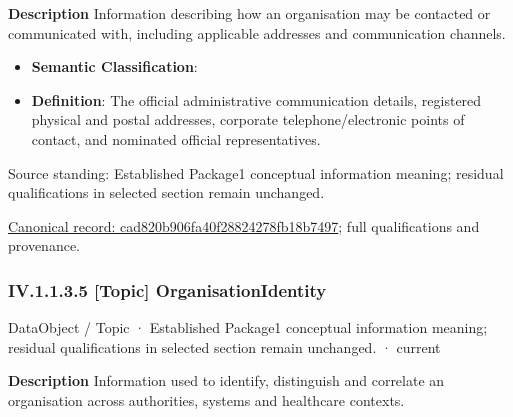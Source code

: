 \textbf{Description}
Information describing how an organisation may be contacted or communicated with, including applicable addresses and communication channels.



\begin{itemize}


\item \textbf{Semantic Classification}: \texttt{}

\item \textbf{Definition}: The official administrative communication details, registered physical and postal addresses, corporate telephone/electronic points of contact, and nominated official representatives.

\end{itemize}


Source standing: Established Package1 conceptual information meaning; residual qualifications in selected section remain unchanged.


{\footnotesize \href{../../../../continuum/application/data-object/topic/cad820b906fa40f28824278fb18b7497.md}{Canonical record: cad820b906fa40f28824278fb18b7497}; full qualifications and provenance.}\par
\subsubsection*{IV.1.1.3.5 [Topic] OrganisationIdentity}
\label{navigation:IV.1.1.3.5}

\label{element:c240be16de76415682237a238b3d3fc8}
{\small DataObject / Topic · Established Package1 conceptual information meaning; residual qualifications in selected section remain unchanged. · current}\par

\textbf{Description}
Information used to identify, distinguish and correlate an organisation across authorities, systems and healthcare contexts.



